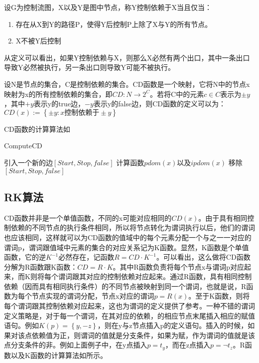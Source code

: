 \begin{definition}
设G为控制流图，X以及Y是图中节点，称Y控制依赖于X当且仅当：
\begin{enumerate}
\item 存在从X到Y的路径P，使得Y后控制P上除了X与Y的所有节点。
\item X不被Y后控制
\end{enumerate}
\end{definition}
从定义可以看出，如果Y控制依赖与X，则那么X必然有两个出口，其中一条出口导致Y必然被执行，另一条出口则导致Y可能不被执行。

\begin{definition}[CD函数]
设N是节点的集合，C是控制依赖的集合。CD函数是一个映射，它将N中的节点x映射为x的所有控制依赖的集合，即$CD:N\to 2^C$。若将C中的元素$c\in C$表示为$\pm y$，其中$+y$表示y的true边，$-y$表示y的false边，则CD函数的定义可以为：$CD\left(x\right):=\left\{\pm y:x\text{控制依赖于}\pm y\right\}$
\end{definition}
CD函数的计算算法如

\begin{algorithm}[H]
	\label{alg:ComputeCD}
	\caption{ComputeCD}
	引入一个新的边$\left[Start,Stop,false\right]$\;
	计算函数$pdom\left(x\right)$以及$ipdom\left(x\right)$\;
	移除$\left[Start,Stop,false\right]$\;
\end{algorithm}

\subsection{RK算法}

CD函数并非是一个单值函数，不同的x可能对应相同的$CD\left(x\right)$。由于具有相同控制依赖的不同节点的执行条件相同，所以将节点转化为谓词执行以后，他们的谓词也应该相同，这样就可以为CD函数的值域中的每个元素分配一个与之一一对应的谓词p，谓词跟值域中元素的集合的对应关系记为K函数。显然，K函数是个单值函数，它的逆$K^{-1}$必然存在，记函数$R=CD\cdot K^{-1}$。可以看出，这么做将CD函数分解为R函数跟K函数：$CD=R\cdot K$。其中R函数负责将每个节点x与谓词p对应起来，而K则将每个谓词跟其对应的控制依赖对应起来。通过R函数，具有相同控制依赖（因而具有相同执行条件）的不同节点被映射到同一个谓词，也就是说，R函数为每个节点实现的谓词分配，节点x对应的谓词$p=R\left(x\right)$。至于K函数，则将每个谓词跟其控制依赖对应起来，这也为谓词的定义提供了参考。一种不错的谓词定义策略是，对于每一个谓词，在其对应的依赖，的相应节点末尾插入相应的赋值语句。例如$K\left(p\right)=\left\{y,-z\right\}$，则在y与z节点插入p的定义语句。插入的时候，如果对该点依赖值为正，则谓词的值就是分支条件，如果为赋，作为谓词的值就是该点分支条件的非。例如上面例子中，在y点插入$p=t_y$，而在z点插入$p=\neg t_z$。R函数以及K函数的计算算法如所示。

